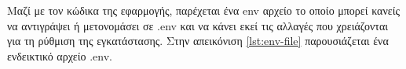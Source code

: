 Μαζί με τον κώδικα της εφαρμογής, παρέχεται ένα env αρχείο το οποίο μπορεί κανείς να αντιγράψει ή μετονομάσει σε .env και να κάνει εκεί τις αλλαγές που χρειάζονται για τη ρύθμιση της εγκατάστασης. Στην απεικόνιση \ref{lst:env-file} παρουσιάζεται ένα ενδεικτικό αρχείο .env.


